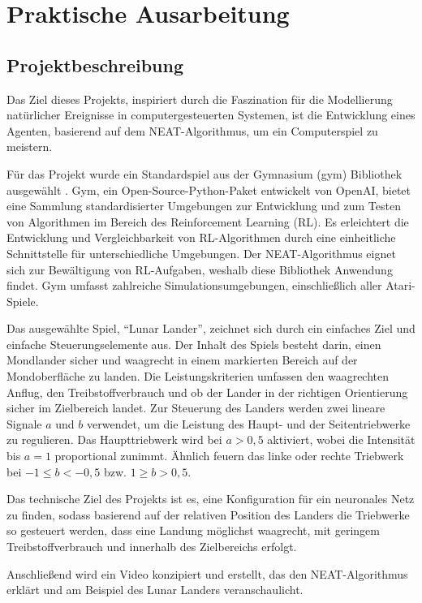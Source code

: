 \chapter{Praktische Ausarbeitung}
\label{chapter:3}
\section{Projektbeschreibung}
Das Ziel dieses Projekts, inspiriert durch die Faszination für die Modellierung natürlicher Ereignisse in computergesteuerten Systemen, ist die Entwicklung eines Agenten, basierend auf dem NEAT-Algorithmus, um ein Computerspiel zu meistern.

Für das Projekt wurde ein Standardspiel aus der Gymnasium (gym) Bibliothek ausgewählt \cite{gymnasiumbib}. Gym, ein Open-Source-Python-Paket entwickelt von OpenAI, bietet eine Sammlung standardisierter Umgebungen zur Entwicklung und zum Testen von Algorithmen im Bereich des Reinforcement Learning (RL). Es erleichtert die Entwicklung und Vergleichbarkeit von RL-Algorithmen durch eine einheitliche Schnittstelle für unterschiedliche Umgebungen. Der NEAT-Algorithmus eignet sich zur Bewältigung von RL-Aufgaben, weshalb diese Bibliothek Anwendung findet. Gym umfasst zahlreiche Simulationsumgebungen, einschließlich aller Atari-Spiele.

Das ausgewählte Spiel, \enquote{Lunar Lander}, zeichnet sich durch ein einfaches Ziel und einfache Steuerungselemente aus. Der Inhalt des Spiels besteht darin, einen Mondlander sicher und waagrecht in einem markierten Bereich auf der Mondoberfläche zu landen. Die Leistungskriterien umfassen den waagrechten Anflug, den Treibstoffverbrauch und ob der Lander in der richtigen Orientierung sicher im Zielbereich landet. Zur Steuerung des Landers werden zwei lineare Signale $a$ und $b$ verwendet, um die Leistung des Haupt- und der Seitentriebwerke zu regulieren. Das Haupttriebwerk wird bei $a>0,5$ aktiviert, wobei die Intensität bis $a=1$ proportional zunimmt. Ähnlich feuern das linke oder rechte Triebwerk bei $-1\leq b<-0,5$ bzw. $1 \geq b>0,5$.

Das technische Ziel des Projekts ist es, eine Konfiguration für ein neuronales Netz zu finden, sodass basierend auf der relativen Position des Landers die Triebwerke so gesteuert werden, dass eine Landung möglichst waagrecht, mit geringem Treibstoffverbrauch und innerhalb des Zielbereichs erfolgt.

Anschließend wird ein Video konzipiert und erstellt, das den NEAT-Algorithmus erklärt und am Beispiel des Lunar Landers veranschaulicht.

